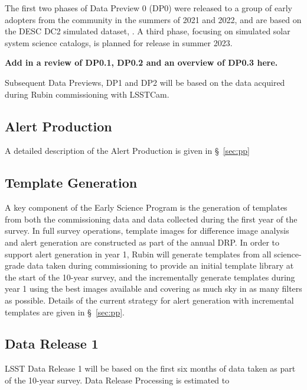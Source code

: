The first two phases of Data Preview 0 (DP0) were released to a group of early adopters from the community in the summers of 2021 and 2022, and are based on the DESC DC2 simulated dataset, \citep{2021ApJS..253...31L}. A third phase, focusing on simulated solar system science catalogs, is planned for release in summer 2023.

{\bf Add in a review of DP0.1, DP0.2 and an overview of  DP0.3  here.}

Subsequent Data Previews, DP1 and DP2 will be based on the data acquired during Rubin commissioning with LSSTCam.

\subsection{Alert Production}

A detailed description of the Alert Production is given in \S~\ref{sec:pp}

\subsection {Template Generation}

A key component of the Early Science Program is the generation of templates from both the commissioning data and data collected during the first year of the survey.
In full survey operations, template images for difference image analysis and alert generation are constructed as part of the annual DRP.
In order to support alert generation in year 1, Rubin will generate templates from all science-grade data taken during commissioning to provide an initial template library at the start of the 10-year survey, and the incrementally generate templates during year 1 using the best images available and covering as much sky in as many filters as possible.
Details of the current strategy for alert generation  with incremental templates are given in  \S~\ref{sec:pp}.

\subsection{Data Release 1}

LSST Data Release 1 will be based on the first six months of data taken as part of the 10-year survey.
Data Release Processing is estimated to

